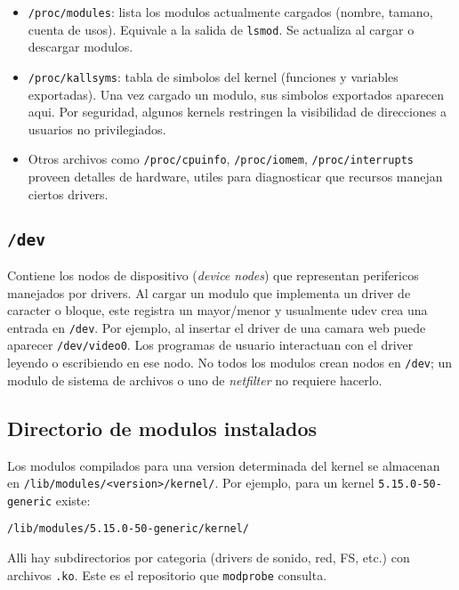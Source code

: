 \begin{itemize}
  \item \texttt{/proc/modules}: lista los modulos actualmente cargados (nombre, tamano, cuenta de usos). Equivale a la salida de \texttt{lsmod}. Se actualiza al cargar o descargar modulos.
  \item \texttt{/proc/kallsyms}: tabla de simbolos del kernel (funciones y variables exportadas). Una vez cargado un modulo, sus simbolos exportados aparecen aqui. Por seguridad, algunos kernels restringen la visibilidad de direcciones a usuarios no privilegiados.
  \item Otros archivos como \texttt{/proc/cpuinfo}, \texttt{/proc/iomem}, \texttt{/proc/interrupts} proveen detalles de hardware, utiles para diagnosticar que recursos manejan ciertos drivers.
\end{itemize}

\subsection*{\texttt{/dev}}

Contiene los nodos de dispositivo (\emph{device nodes}) que representan perifericos manejados por drivers. Al cargar un modulo que implementa un driver de caracter o bloque, este registra un mayor/menor y usualmente udev crea una entrada en \texttt{/dev}. Por ejemplo, al insertar el driver de una camara web puede aparecer \texttt{/dev/video0}. Los programas de usuario interactuan con el driver leyendo o escribiendo en ese nodo. No todos los modulos crean nodos en \texttt{/dev}; un modulo de sistema de archivos o uno de \emph{netfilter} no requiere hacerlo.

\subsection*{Directorio de modulos instalados}

Los modulos compilados para una version determinada del kernel se almacenan en
\texttt{/lib/modules/<version>/kernel/}. Por ejemplo, para un kernel \texttt{5.15.0-50-generic} existe:

\begin{center}
\texttt{/lib/modules/5.15.0-50-generic/kernel/}
\end{center}

Alli hay subdirectorios por categoria (drivers de sonido, red, FS, etc.) con archivos \texttt{.ko}. Este es el repositorio que \texttt{modprobe} consulta.

